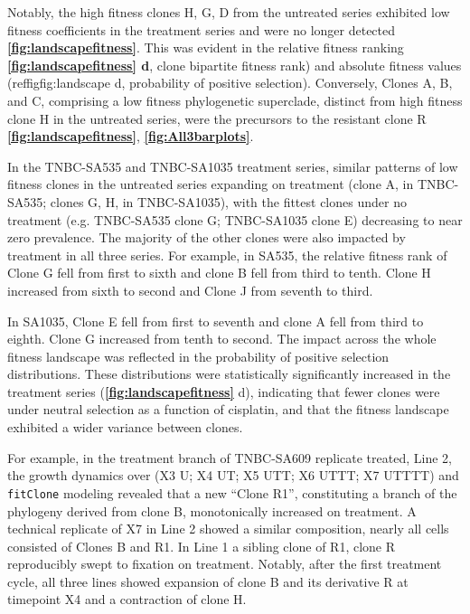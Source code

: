 Notably, the high fitness clones H, G, D from the untreated series exhibited low fitness coefficients in the treatment series and were no longer detected \textbf{\autoref{fig:landscapefitness}}. This was evident in the relative fitness ranking \textbf{\autoref{fig:landscapefitness} d}, clone bipartite fitness rank) and absolute fitness values (reffig{fig:landscape} d, probability of positive selection). Conversely, Clones A, B,  and C, comprising a low fitness phylogenetic superclade, distinct from high fitness clone H in the untreated series, were the precursors to the resistant clone R \textbf{\autoref{fig:landscapefitness}}, \textbf{\autoref{fig:All3barplots}}. 

In the TNBC-SA535 and TNBC-SA1035 treatment series, similar patterns of low fitness clones in the untreated series expanding on treatment (clone A, in TNBC-SA535; clones G, H, in TNBC-SA1035), with the fittest clones under no treatment (e.g. TNBC-SA535 clone G; TNBC-SA1035 clone E) decreasing to near zero prevalence. The majority of the other clones were also impacted by treatment in all three series. For example, in SA535, the relative fitness rank of Clone G fell from first to sixth and clone B fell from third to tenth.  Clone H increased from sixth to second and Clone J from seventh to third.  

In SA1035, Clone E fell from first to seventh and clone A fell from third to eighth. Clone G increased from tenth to second.  The impact across the whole fitness landscape was reflected in the probability of positive selection distributions.  These distributions were statistically significantly increased in the treatment series  (\textbf{\autoref{fig:landscapefitness}} d), indicating that fewer clones were under neutral selection as a function of cisplatin, and that the fitness landscape exhibited a wider variance between clones.

For example, in the treatment branch of TNBC-SA609 replicate treated, Line 2, the growth dynamics over (X3 U; X4 UT; X5 UTT; X6 UTTT; X7 UTTTT) and \texttt{fitClone} modeling revealed that a new ``Clone R1'', constituting a branch of the phylogeny derived from clone B, monotonically increased on treatment.  A technical replicate of X7 in Line 2 showed a similar composition, nearly all cells consisted of Clones B and R1.  In Line 1 a sibling clone of R1, clone R reproducibly swept to fixation on treatment.  Notably, after the first treatment cycle, all three lines showed expansion of clone B and its derivative R at timepoint X4 and a contraction of clone H.



